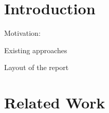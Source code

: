 \section{Introduction}

Motivation:

Existing approaches

Layout of the report

\section{Related Work}
